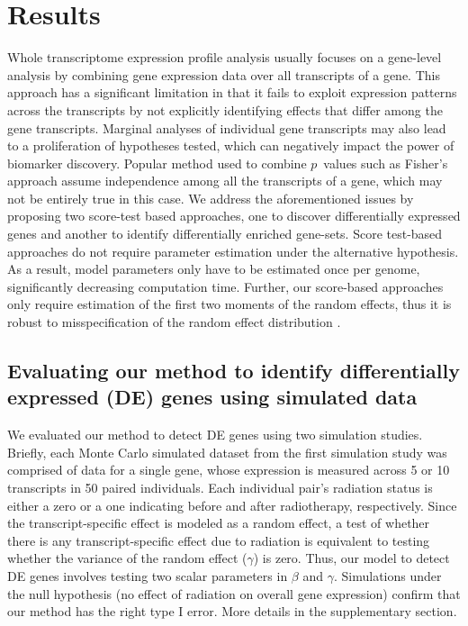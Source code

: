 \documentclass[hidelinks,11pt]{article}
\begin{document}
\section*{Results}

Whole transcriptome expression profile analysis usually focuses on a gene-level analysis by combining gene expression data over all transcripts of a gene. This approach has a significant limitation in that it fails to exploit expression patterns across the transcripts by not explicitly identifying effects that differ among the gene transcripts. Marginal analyses of individual gene transcripts may also lead to a proliferation of hypotheses tested, which can negatively impact the power of biomarker discovery. Popular method used to combine $p$~values such as Fisher's approach assume independence among all the transcripts of a gene, which may not be entirely true in this case. We address the aforementioned issues by proposing two score-test based approaches, one to discover differentially expressed genes and another to identify differentially enriched gene-sets.  Score test-based approaches do not require parameter estimation under the alternative hypothesis. As a result, model parameters only have to be estimated once per genome, significantly decreasing computation time. Further, our score-based approaches only require estimation of the first two moments of the random effects, thus it is robust to misspecification of the random effect distribution \cite{xlin_varComp_test}.

\subsection*{Evaluating our method to identify differentially expressed (DE) genes using simulated data}
We evaluated our method to detect DE genes using two simulation studies. Briefly, each Monte Carlo simulated dataset from the first simulation study was comprised of data for a single gene, whose expression is measured across 5 or 10 transcripts in 50 paired individuals. Each individual pair's radiation status is either a zero or a one indicating before and after radiotherapy, respectively. Since the transcript-specific effect is modeled as a random effect, a test of whether there is any transcript-specific effect due to radiation is equivalent to testing whether the variance of the random effect ($\gamma$) is zero. Thus, our model to detect DE genes involves testing two scalar parameters in $\beta$ and $\gamma$. Simulations under the null hypothesis (no effect of radiation on overall gene expression) confirm that our method has the right type I error. More details in the supplementary section. 
\end{document}
